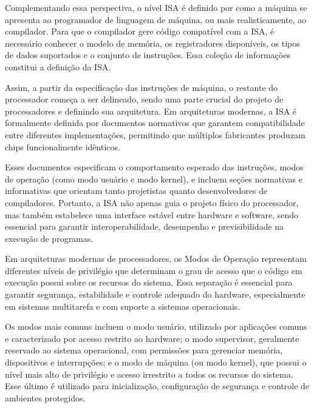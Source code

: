 \documentclass[
	12pt,				%
	openright,			%
	oneside,			%
	a4paper,			%
	english,			%
	french,				%
	spanish,			%
	brazil,				%
	]{abntex2}
\begin{document}
Complementando essa perspectiva, o nível ISA é definido por como a máquina se apresenta ao programador de linguagem de máquina, ou mais realisticamente, ao compilador. Para que o compilador gere código compatível com a ISA, é necessário conhecer o modelo de memória, os registradores disponíveis, os tipos de dados suportados e o conjunto de instruções. Essa coleção de informações constitui a definição da ISA.\cite[p.345-346]{tanenbaum_structured_2013}

Assim, a partir da especificação das instruções de máquina, o restante do processador começa a ser delineado, sendo uma parte crucial do projeto de processadores e definindo sua arquitetura. Em arquiteturas modernas, a ISA é formalmente definida por documentos normativos que garantem compatibilidade entre diferentes implementações, permitindo que múltiplos fabricantes produzam chips funcionalmente idênticos.\cite[p.346]{tanenbaum_structured_2013}

Esses documentos especificam o comportamento esperado das instruções, modos de operação (como modo usuário e modo kernel), e incluem seções normativas e informativas que orientam tanto projetistas quanto desenvolvedores de compiladores. Portanto, a ISA não apenas guia o projeto físico do processador, mas também estabelece uma interface estável entre hardware e software, sendo essencial para garantir interoperabilidade, desempenho e previsibilidade na execução de programas.
\cite[p.346-347]{tanenbaum_structured_2013}


Em arquiteturas modernas de processadores, os Modos de Operação representam diferentes níveis de privilégio que determinam o grau de acesso que o código em execução possui sobre os recursos do sistema. Essa separação é essencial para garantir segurança, estabilidade e controle adequado do hardware, especialmente em sistemas multitarefa e com suporte a sistemas operacionais.\cite[p.9]{risc-v_risc-v_2024-1}

Os modos mais comuns incluem o modo usuário, utilizado por aplicações comuns e caracterizado por acesso restrito ao hardware; o modo supervisor, geralmente reservado ao sistema operacional, com permissões para gerenciar memória, dispositivos e interrupções; e o modo de máquina (ou modo kernel), que possui o nível mais alto de privilégio e acesso irrestrito a todos os recursos do sistema. Esse último é utilizado para inicialização, configuração de segurança e controle de ambientes protegidos.\cite[p.9]{risc-v_risc-v_2024-1}
\end{document}
